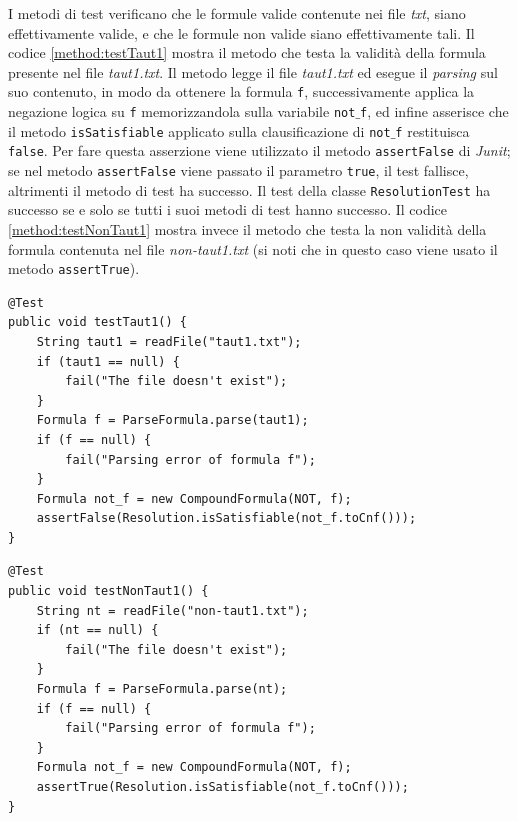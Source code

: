 \documentclass[a4paper,12pt]{report}
\begin{document}
I metodi di test verificano che le formule valide contenute nei file \emph{txt}, siano effettivamente valide, e che le formule non valide siano effettivamente tali. Il codice \ref{method:testTaut1} mostra il metodo che testa la validità della formula presente nel file \emph{taut1.txt}. Il metodo legge il file \emph{taut1.txt} ed esegue il \emph{parsing} sul suo contenuto, in modo da ottenere la formula \texttt{f}, successivamente applica la negazione logica su \texttt{f} memorizzandola sulla variabile \texttt{not$\_$f}, ed infine asserisce che il metodo \texttt{isSatisfiable} applicato sulla clausificazione di \texttt{not$\_$f} restituisca \texttt{false}. Per fare questa asserzione viene utilizzato il metodo \texttt{assertFalse} di \emph{Junit}; se nel metodo \texttt{assertFalse} viene passato il parametro \texttt{true}, il test fallisce, altrimenti il metodo di test ha successo. Il test della classe \texttt{ResolutionTest} ha successo se e solo se tutti i suoi metodi di test hanno successo. Il codice \ref{method:testNonTaut1} mostra invece il metodo che testa la non validità della formula contenuta nel file \emph{non-taut1.txt} (si noti che in questo caso viene usato il metodo \texttt{assertTrue}).

\begin{minipage}{\linewidth}
    \begin{lstlisting}[caption={Metodo che testa la validità della formula nel file \emph{taut1.txt}}, label={method:testTaut1}]
@Test
public void testTaut1() {
    String taut1 = readFile("taut1.txt");
    if (taut1 == null) {
        fail("The file doesn't exist");
    }
    Formula f = ParseFormula.parse(taut1);
    if (f == null) {
        fail("Parsing error of formula f");
    }
    Formula not_f = new CompoundFormula(NOT, f);
    assertFalse(Resolution.isSatisfiable(not_f.toCnf()));
}
    \end{lstlisting}
\end{minipage}

\vspace{20pt}

\begin{minipage}{\linewidth}
    \begin{lstlisting}[caption={Metodo che testa la non validità della formula nel file \emph{non-taut1.txt}}, label={method:testNonTaut1}]
@Test
public void testNonTaut1() {
    String nt = readFile("non-taut1.txt");
    if (nt == null) {
        fail("The file doesn't exist");
    }
    Formula f = ParseFormula.parse(nt);
    if (f == null) {
        fail("Parsing error of formula f");
    }
    Formula not_f = new CompoundFormula(NOT, f);
    assertTrue(Resolution.isSatisfiable(not_f.toCnf()));
}
    \end{lstlisting}
\end{minipage}
\end{document}
